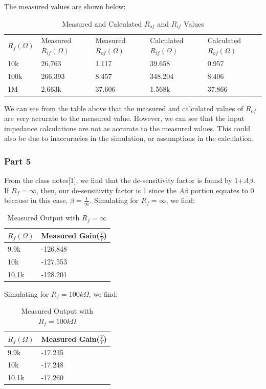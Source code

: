 \documentclass[12pt]{article}
\begin{document}
The measured values are shown below:

\begin{table}[h!]
    \centering
    \begin{tabular}{lllll}
    
    $R_f (\Omega)$ & Measured  $R_{if}(\Omega)$ & Measured $R_{of}(\Omega)$ & Calculated $R_{if}(\Omega)$ & Calculated  $R_{of}(\Omega)$ \\ \cline{1-5}
    10k & 26.763 & 1.117 & 39.658 & 0.957 \\ 
    100k & 266.393 & 8.457 & 348.204 & 8.406 \\
    1M & 2.663k & 37.606 & 1.568k & 37.866
    \end{tabular}
    \caption{Measured and Calculated $R_{of}$ and $R_{if}$ Values}
    \label{measuredcalcrifrof}
\end{table}

We can see from the table above that the measured and calculated values of $R_{of}$ 
are very accurate to the measured value. However, we can see that the input impedance
calculations are not as accurate to the measured values. This could also be due to 
inaccuracies in the simulation, or assumptions in the calculation.

\subsubsection{Part 5}

From the class notes[1], we find that the de-sensitivity factor is found by 1+$A\beta$. If $R_f = \infty$,
then, our de-sensitivity factor is 1 since the $A\beta$ portion equates to 0 because in this case, $\beta=\frac
{1}{\infty}$.
Simulating for $R_f=\infty$, we find:

\begin{table}[h!]
    \centering
    \begin{tabular}{ll}
    $R_f(\Omega)$ & Measured Gain($\frac{V}{V}$) \\ \hline
    9.9k & -126.848 \\ 
    10k & -127.553 \\
    10.1k & -128.201
    \end{tabular}
    \caption{Measured Output with $R_f=\infty$}
    \label{measuredoutinf}
\end{table}

Simulating for $R_f=100k\Omega$, we find:

\begin{table}[h!]
    \centering
    \begin{tabular}{ll}
    $R_f(\Omega)$ & Measured Gain($\frac{V}{V}$) \\ \hline
    9.9k & -17.235 \\ 
    10k & -17.248 \\
    10.1k & -17.260
    \end{tabular}
    \caption{Measured Output with $R_f=100k\Omega$}
    \label{measuredout}
\end{table}
\end{document}

